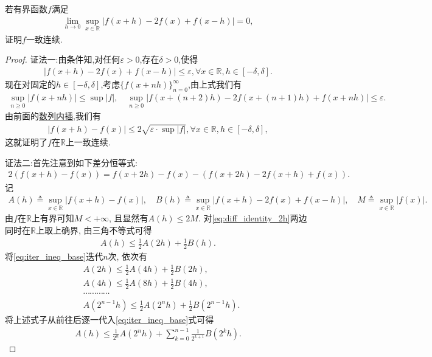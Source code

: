 \documentclass[../../main.tex]{subfiles}%
\begin{document}
\begin{example}
若有界函数$f$满足
\begin{align*}
\lim_{h \to 0} \sup_{x \in \mathbb{R}} |f(x + h) - 2f(x) + f(x - h)| = 0,
\end{align*}
证明$f$一致连续.
\end{example}
\begin{proof}

{\color{blue}证法一:}由条件知,对任何$\varepsilon > 0$,存在$\delta > 0$,使得
\begin{align*}
|f(x + h) - 2f(x) + f(x - h)| \leqslant \varepsilon, \forall x \in \mathbb{R}, h \in [-\delta, \delta].
\end{align*}
现在对固定的$h \in [-\delta, \delta]$,考虑$\{f(x + nh)\}_{n=0}^\infty$,由上式我们有
\begin{align*}
\sup_{n \geqslant 0} |f(x + nh)| \leqslant \sup |f|,\quad \sup_{n \geqslant 0} |f(x + (n + 2)h) - 2f(x + (n + 1)h) + f(x + nh)| \leqslant \varepsilon.
\end{align*}
由前面的\hyperref[proposition:数列内插]{数列内插},我们有
\begin{align*}
|f(x + h) - f(x)| \leqslant 2\sqrt{\varepsilon \cdot \sup |f|}, \forall x \in \mathbb{R}, h \in [-\delta, \delta],
\end{align*}
这就证明了$f$在$\mathbb{R}$上一致连续.

{\color{blue}证法二:}首先注意到如下差分恒等式:
\begin{align}
2\left(f(x+h)-f(x)\right) = f(x+2h) - f(x) - \left(f(x+2h) - 2f(x+h) + f(x)\right).
\label{eq:diff_identity_2h}
\end{align}
记
\begin{align*}
A(h) \triangleq \sup_{x \in \mathbb{R}} \left| f(x+h) - f(x) \right|, \quad
B(h) \triangleq \sup_{x \in \mathbb{R}} \left| f(x+h) - 2f(x) + f(x-h) \right|, \quad
M \triangleq \sup_{x \in \mathbb{R}} \left| f(x) \right|.
\end{align*}
由$f$在$\mathbb{R}$上有界可知$M < +\infty$, 且显然有$A(h) \leqslant 2M$.
对\eqref{eq:diff_identity_2h}两边同时在$\mathbb{R}$上取上确界, 由三角不等式可得
\begin{align}
A(h) \leqslant \frac{1}{2}A(2h) + \frac{1}{2}B(h).
\label{eq:iter_ineq_base}
\end{align}
将\eqref{eq:iter_ineq_base}迭代$n$次, 依次有
\begin{align*}
&A(2h)\leqslant \frac{1}{2}A(4h)+\frac{1}{2}B(2h),
\\
&A(4h)\leqslant \frac{1}{2}A(8h)+\frac{1}{2}B(4h),
\\
&\cdots \cdots \cdots \cdots 
\\
&A(2^{n-1}h)\leqslant \frac{1}{2}A(2^nh)+\frac{1}{2}B(2^{n-1}h).
\end{align*}
将上述式子从前往后逐一代入\eqref{eq:iter_ineq_base}式可得
\begin{align}
A(h) \leqslant \frac{1}{2^n} A(2^n h) + \sum\limits_{k=0}^{n-1} \frac{1}{2^{k+1}} B(2^k h).
\label{eq:iter_ineq_n}
\end{align}


\end{proof}
\end{document}
